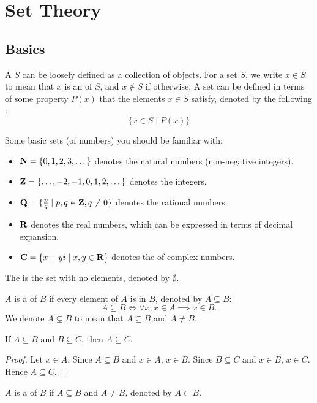 \chapter{Set Theory}\label{chap:set-theory}
\section{Basics}
A  $S$ can be loosely defined as a collection of objects. For a set $S$, we write $x \in S$ to mean that $x$ is an  of $S$, and $x \notin S$ if otherwise. A set can be defined in terms of some property $P(x)$ that the elements $x \in S$ satisfy, denoted by the following :
\[ \{x \in S \mid P(x)\} \]

Some basic sets (of numbers) you should be familiar with:
\begin{itemize}
\item $\mathbf N=\{0,1,2,3,\dots\}$ denotes the natural numbers (non-negative integers).
\item $\mathbf Z=\{\dots,-2,-1,0,1,2,\dots\}$ denotes the integers.
\item $\mathbf Q=\{\frac{p}{q} \mid p,q\in\mathbf Z, q\neq0\}$ denotes the rational numbers.
\item $\mathbf R$ denotes the real numbers, which can be expressed in terms of decimal expansion.
\item $\mathbf C=\{x+yi \mid x,y\in\mathbf R\}$ denotes the of complex numbers.
\end{itemize}

The  is the set with no elements, denoted by $\emptyset$.

$A$ is a  of $B$ if every element of $A$ is in $B$, denoted by $A \subseteq B$:
\[A\subseteq B\iff \forall x, x\in A \implies x\in B.\]
We denote $A\subsetneq B$ to mean that $A\subseteq B$ and $A\neq B$.

\begin{proposition}
If $A \subseteq B$ and $B \subseteq C$, then $A \subseteq C$.
\end{proposition}

\begin{proof}
Let $x\in A$. 
Since $A \subseteq B$ and $x\in A$, $x\in B$. 
Since $B \subseteq C$ and $x\in B$, $x\in C$. 
Hence $A \subseteq C$.
\end{proof}

$A$ is a  of $B$ if $A \subseteq B$ and $A \neq B$, denoted by $A \subset B$.

